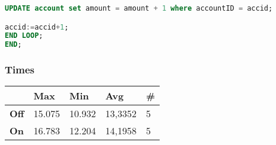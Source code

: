 \documentclass[a4paper, 10pt]{article}
\begin{document}
\begin{minipage}
\begin{lstlisting}[language=SQL]
UPDATE account set amount = amount + 1 where accountID = accid;

accid:=accid+1;
END LOOP;
END;\end{lstlisting}

\subsubsection{Times}
\begin{table}[H]
\begin{tabular}{l|l|l|l|l|}
\cline{2-5}
\textbf{}                             & \textbf{Max} & \textbf{Min} & \textbf{Avg} & \textbf{\#}  \\ \hline
\multicolumn{1}{|l|}{\textbf{Off}} & 15.075         & 10.932         & 13,3352          & 5            \\ \hline
\multicolumn{1}{|l|}{\textbf{On}}  & 16.783         & 12.204         & 14,1958          & 5            \\ \hline
\end{tabular}
\end{table}
\end{minipage}
\end{document}
